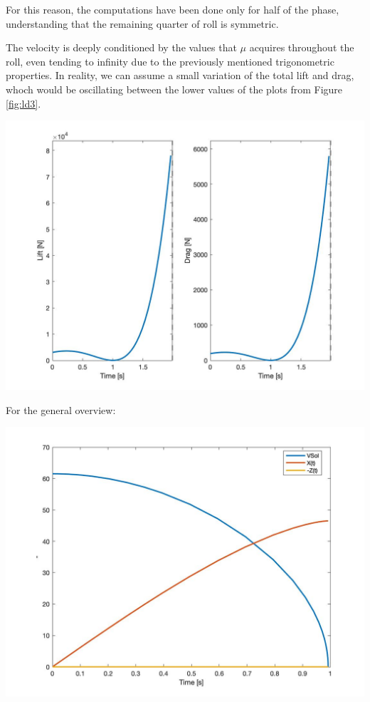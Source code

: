 For this reason, the computations have been done only for half of the phase, understanding that the remaining quarter of roll is symmetric.

The velocity is deeply conditioned by the values that $\mu$ acquires throughout the roll, even tending to infinity due to the previously mentioned trigonometric properties. In reality, we can assume a small variation of the total lift and drag, whoch would be oscillating between the lower values of the plots from Figure \ref{fig:ld3}.
\begin{center}
	\includegraphics[width=\linewidth]{../matlab/3/liftdrag.jpg}
	\vspace{0.5cm}
	\vspace{0.25cm}
	\label{fig:ld3}
\end{center}

For the general overview:
\begin{center}
	\includegraphics[width=\linewidth]{../matlab/3/3traj.jpg}
	\vspace{0.5cm}
	\vspace{0.25cm}
	\label{fig:3traj}
\end{center}

